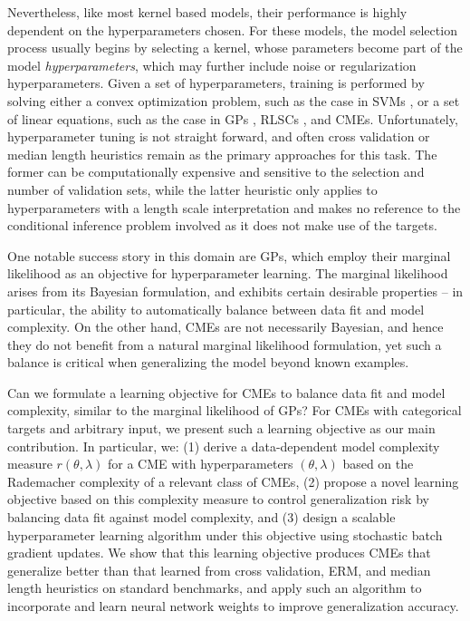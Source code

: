 \documentclass[runningheads, envcountsame, a4paper]{llncs}
\begin{document}
		Nevertheless, like most kernel based models, their performance is highly dependent on the hyperparameters chosen. For these models, the model selection process usually begins by selecting a kernel, whose parameters become part of the model \textit{hyperparameters}, which may further include noise or regularization hyperparameters. Given a set of hyperparameters, training is performed by solving either a convex optimization problem, such as the case in \glspl{SVM} \citep{scholkopf2002learning}, or a set of linear equations, such as the case in \gls{GPs} \citep{rasmussen2006gaussian}, \glspl{RLSC} \citep{rifkin2003regularized}, and \glspl{CME}. Unfortunately, hyperparameter tuning is not straight forward, and often cross validation \citep{song2013kernel} or median length heuristics \citep{muandet2016kernel} remain as the primary approaches for this task. The former can be computationally expensive and sensitive to the selection and number of validation sets, while the latter heuristic only applies to hyperparameters with a length scale interpretation and makes no reference to the conditional inference problem involved as it does not make use of the targets.
		
		One notable success story in this domain are \gls{GPs}, which employ their marginal likelihood as an objective for hyperparameter learning. The marginal likelihood arises from its Bayesian formulation, and exhibits certain desirable properties -- in particular, the ability to automatically balance between data fit and model complexity. On the other hand, \glspl{CME} are not necessarily Bayesian, and hence they do not benefit from a natural marginal likelihood formulation, yet such a balance is critical when generalizing the model beyond known examples.
		
		Can we formulate a learning objective for \glspl{CME} to balance data fit and model complexity, similar to the marginal likelihood of \gls{GPs}? For \glspl{CME} with categorical targets and arbitrary input, we present such a learning objective as our main contribution. In particular, we: (1) derive a data-dependent model complexity measure $r(\theta, \lambda)$ for a \gls{CME} with hyperparameters $(\theta, \lambda)$ based on the Rademacher complexity of a relevant class of \glspl{CME}, (2) propose a novel learning objective based on this complexity measure to control generalization risk by balancing data fit against model complexity, and (3) design a scalable hyperparameter learning algorithm under this objective using stochastic batch gradient updates. We show that this learning objective produces \glspl{CME} that generalize better than that learned from cross validation, \gls{ERM}, and median length heuristics on standard benchmarks, and apply such an algorithm to incorporate and learn neural network weights to improve generalization accuracy.
	
\end{document}
